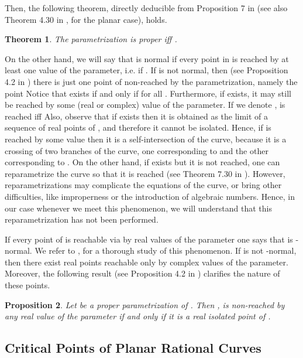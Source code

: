 \documentclass{elsart}
\newtheorem{theorem}{{\bf Theorem}}
\newtheorem{proposition}[theorem]{{\bf Proposition}}
\begin{document}
Then, the following theorem, directly deducible from Proposition 7
in \cite{Rubio} (see also Theorem 4.30 in \cite{SWPD}, for the
planar case), holds.

\begin{theorem} \label{th-charact-proper}
The parametrization  is proper iff .
\end{theorem}

On the other hand, we will say that  is {\sf normal} if
every point in  is reached by at least one value of
the parameter, i.e. if
. If  is
not normal, then (see Proposition 4.2 in \cite{Andradas})
there is just one point of  non-reached by the parametrization,
namely the point Notice that  exists
if and only if
 for all . Furthermore, if  exists,
it may still be reached by some (real or complex) value of the parameter. If we denote
,  is reached iff 
Also, observe that if  exists then it is obtained as the limit of a
sequence of real points of , and therefore it cannot be isolated.
 Hence, if  is reached by some value  then it is a self-intersection
 of the curve, because it is a crossing of two branches of the curve, one corresponding to  and the
 other corresponding to . On the other hand,
 if  exists but it is not reached, one can
 reparametrize the curve so that it is reached (see Theorem 7.30
 in \cite{SWPD}). However, reparametrizations may complicate the
 equations of the curve, or bring other difficulties, like
 improperness or the introduction of algebraic numbers. Hence, in our case whenever we meet this
 phenomenon, we will understand that this reparametrization has
 not been performed.

If every point of  is reachable via  by real values of the parameter
 one says that  is -{\sf normal}. We refer to \cite{Andradas}, \cite{SWPD} for a
 thorough study of this phenomenon. If  is not -{\sf normal}, then there exist real
 points  reachable only by complex values of the parameter. Moreover, the following
 result (see  Proposition 4.2 in \cite{Andradas}) clarifies the nature of these points.

\begin{proposition}\label{R-normal}
Let  be a proper parametrization of .
Then ,  is non-reached by any real value of the
parameter if and only if it
is a real isolated point of .
\end{proposition}





\subsection{Critical Points of Planar Rational Curves}\label{add-back}
\end{document}
